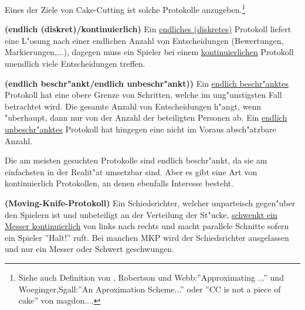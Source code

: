 Eines der Ziele von Cake-Cutting ist solche Protokolle anzugeben.\footnote{Siehe
auch Definition von \cite{3}, Robertson und Webb:''Approximating ...'' und
Woeginger,Sgall:''An Aproximation Scheme...'' oder
''CC is not a piece of cake'' von
magdon....}
\begin{defi}{\textbf{(endlich (diskret)/kontinuierlich)}}
\newline Ein \underline{endliches (diskretes)} Protokoll liefert eine L"osung
nach einer endlichen Anzahl von Entscheidungen (Bewertungen,
Markierungen,$\ldots$), dagegen muss ein Spieler bei einem
\underline{kontinuierlichen} Protokoll unendlich viele Entscheidungen treffen.
\end{defi}
\begin{defi}{\textbf{(endlich beschr"ankt/endlich unbeschr"ankt))}}
\newline Ein \underline{endlich beschr"anktes} Protokoll hat eine obere Grenze
von Schritten, welche im ung"unstigsten Fall betrachtet wird. Die gesamte Anzahl
von Entscheidungen h"angt, wenn "uberhaupt, dann nur von der Anzahl der
beteiligten Personen ab. Ein \underline{endlich unbeschr"anktes} Protokoll hat
hingegen eine nicht im Voraus absch"atzbare Anzahl.
\end{defi}
Die am meisten gesuchten Protokolle sind endlich beschr"ankt, da sie am
einfachsten in der Realit"at umsetzbar sind. Aber es gibt eine Art von
kontinuierlich Protokollen, an denen ebenfalls Interesse besteht.
\begin{defi}{\textbf{(Moving-Knife-Protokoll)}}
\newline Ein Schiedsrichter, welcher unparteisch gegen"uber den Spielern ist und
unbeteiligt an der Verteilung der St"ucke, \underline{schwenkt ein Messer
kontinuierlich} von links nach rechts und macht parallele Schnitte sofern ein
Spieler ''Halt!'' ruft. Bei manchen
MKP wird der
Schiedsrichter ausgelassen und nur ein Messer oder Schwert geschwungen.
\end{defi}
\pagebreak
